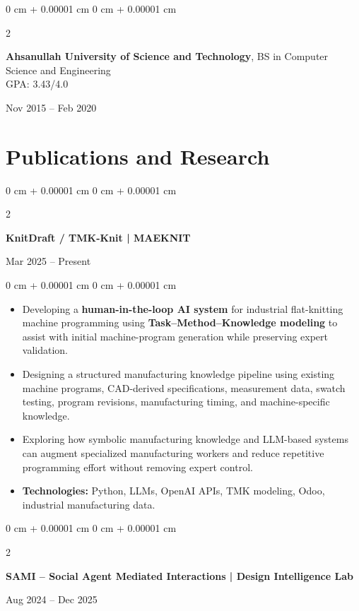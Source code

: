 \documentclass[10pt, letterpaper]{article}
\newenvironment{highlights}{
    \begin{itemize}[
        topsep=0.10 cm,
        parsep=0.10 cm,
        partopsep=0pt,
        itemsep=0pt,
        leftmargin=0 cm + 10pt
    ]
}{
    \end{itemize}
}
\newenvironment{onecolentry}{
    \begin{adjustwidth}{
        0 cm + 0.00001 cm
    }{
        0 cm + 0.00001 cm
    }
}{
    \end{adjustwidth}
}
\newenvironment{twocolentry}[2][]{
    \onecolentry
    \def\secondColumn{#2}
    \setcolumnwidth{\fill, 4.5 cm}
    \begin{paracol}{2}
}{
    \switchcolumn \raggedleft \secondColumn
    \end{paracol}
    \endonecolentry
}
\begin{document}
\vspace{0.15 cm}

\begin{twocolentry}{Nov 2015 -- Feb 2020}
\textbf{Ahsanullah University of Science and Technology}, BS in Computer Science and Engineering \\
GPA: 3.43/4.0
\end{twocolentry}

\section{Publications and Research}

\begin{twocolentry}{Mar 2025 -- Present}
\textbf{KnitDraft / TMK-Knit | MAEKNIT}
\end{twocolentry}

\begin{onecolentry}
\begin{highlights}

\item Developing a \textbf{human-in-the-loop AI system} for industrial flat-knitting machine programming using \textbf{Task--Method--Knowledge modeling} to assist with initial machine-program generation while preserving expert validation.

\item Designing a structured manufacturing knowledge pipeline using existing machine programs, CAD-derived specifications, measurement data, swatch testing, program revisions, manufacturing timing, and machine-specific knowledge.

\item Exploring how symbolic manufacturing knowledge and LLM-based systems can augment specialized manufacturing workers and reduce repetitive programming effort without removing expert control.

\item \textbf{Technologies:} Python, LLMs, OpenAI APIs, TMK modeling, Odoo, industrial manufacturing data.

\end{highlights}
\end{onecolentry}

\vspace{0.2 cm}

\begin{twocolentry}{Aug 2024 -- Dec 2025}
\textbf{SAMI -- Social Agent Mediated Interactions | Design Intelligence Lab}
\end{twocolentry}
\end{document}
